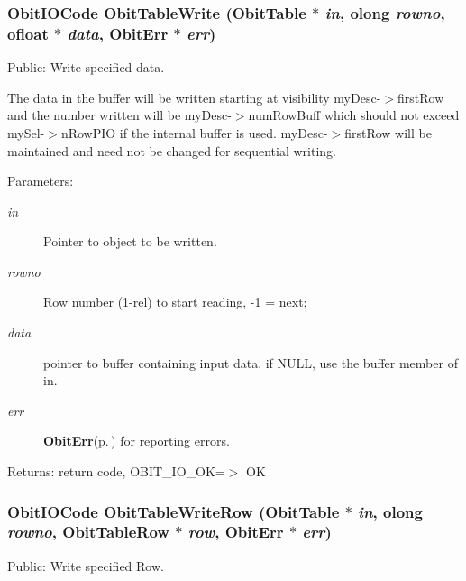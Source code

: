 \subsubsection{\setlength{\rightskip}{0pt plus 5cm}Obit\-IOCode Obit\-Table\-Write ({\bf Obit\-Table} $\ast$ {\em in}, {\bf olong} {\em rowno}, {\bf ofloat} $\ast$ {\em data}, {\bf Obit\-Err} $\ast$ {\em err})}\label{ObitTable_8h_a44}


Public: Write specified data. 

The data in the buffer will be written starting at visibility my\-Desc-$>$first\-Row and the number written will be my\-Desc-$>$num\-Row\-Buff which should not exceed my\-Sel-$>$n\-Row\-PIO if the internal buffer is used. my\-Desc-$>$first\-Row will be maintained and need not be changed for sequential writing. \begin{Desc}
\item[Parameters:]
\begin{description}
\item[{\em in}]Pointer to object to be written. \item[{\em rowno}]Row number (1-rel) to start reading, -1 = next; \item[{\em data}]pointer to buffer containing input data. if NULL, use the buffer member of in. \item[{\em err}]{\bf Obit\-Err}{\rm (p.\,\pageref{structObitErr})} for reporting errors. \end{description}
\end{Desc}
\begin{Desc}
\item[Returns:]return code, OBIT\_\-IO\_\-OK=$>$ OK \end{Desc}
\subsubsection{\setlength{\rightskip}{0pt plus 5cm}Obit\-IOCode Obit\-Table\-Write\-Row ({\bf Obit\-Table} $\ast$ {\em in}, {\bf olong} {\em rowno}, {\bf Obit\-Table\-Row} $\ast$ {\em row}, {\bf Obit\-Err} $\ast$ {\em err})}\label{ObitTable_8h_a46}


Public: Write specified Row. 

